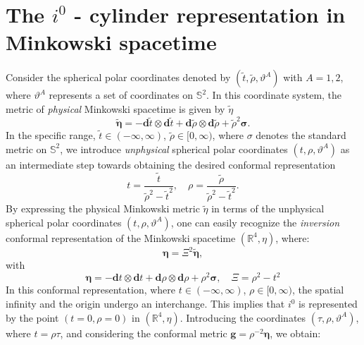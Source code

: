\section{The $i^0$ - cylinder representation in Minkowski  spacetime}
\label{the $i^0$ cylinder}

Consider the spherical polar coordinates denoted by $(\tilde{t}, \tilde{\rho}, \vartheta^A)$ with $A = 1, 2$, where $\vartheta^A$ represents a set of coordinates on $\mathbb{S}^2$. In this coordinate system, the metric of \textit{physical} Minkowski spacetime is given by $\tilde{\eta}$
\begin{equation}\label{eq:physicalMikmetric}
\tilde{\boldsymbol{\eta}}=-\mathbf{d} \tilde{t} \otimes \mathbf{d} \tilde{t}+\mathbf{d} \tilde{\rho} \otimes \mathbf{d} \tilde{\rho}+\tilde{\rho}^2 \boldsymbol{\sigma}.
\end{equation}
In the specific range, $\tilde{t} \in (-\infty, \infty)$, $\tilde{\rho} \in [0, \infty)$, where $\sigma$ denotes the standard metric on $\mathbb{S}^2$, we introduce \textit{unphysical} spherical polar coordinates $(t, \rho, \vartheta^A)$ as an intermediate step towards obtaining the desired conformal representation
\begin{equation}\label{eq:unphysicalCoords}
t=\frac{\tilde{t}}{\tilde{\rho}^2-\tilde{t}^2}, \quad \rho=\frac{\tilde{\rho}}{\tilde{\rho}^2-\tilde{t}^2}.
\end{equation}
By expressing the physical Minkowski metric $\tilde{\eta}$ in terms of the unphysical spherical polar coordinates $(t, \rho, \vartheta^A)$, one can easily recognize the \textit{inversion} conformal representation of the Minkowski spacetime $(\mathbb{R}^4, \eta)$, where:
\begin{equation}\label{eq:metricRelation}
  \boldsymbol{\eta} = \Xi^2 \boldsymbol{\tilde{\eta}},
\end{equation}
with
\begin{equation}\label{eq:Unphysicalspacetimemetric}
  \boldsymbol{\eta}=-\mathbf{d} t \otimes \mathbf{d} t+\mathbf{d} \rho \otimes \mathbf{d} \rho+\rho^2 \boldsymbol{\sigma}, \quad \Xi=\rho^2-t^2
\end{equation}
In this conformal representation, where $t \in (-\infty, \infty)$, $\rho \in [0, \infty)$, the spatial infinity and the origin undergo an interchange. This implies that $i^0$ is represented by the point $(t = 0, \rho = 0)$ in $(\mathbb{R}^4, \eta)$. Introducing the coordinates $(\tau, \rho, \vartheta^A)$, where $t = \rho \tau$, and considering the conformal metric $\boldsymbol{g} = \rho^{-2} \boldsymbol{\eta}$, we obtain:
